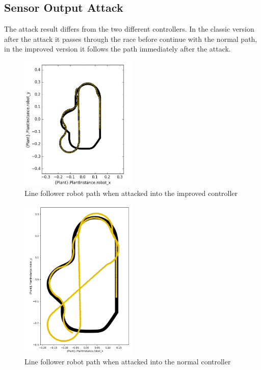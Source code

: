 \subsection{Sensor Output Attack}

The attack result differs from the two different controllers. In the classic
version after the attack it passes through the race before continue with the
normal path, in the improved version it follows the path immediately after the
attack.

\begin{figure}[htb]
	\centering
	\includegraphics[width=0.5\textwidth]{img/mm_sensor_output_attack_improved.png}
	\caption{Line follower robot path when
	attacked into the improved controller}\label{fig:senoutimpatkresult}
\end{figure}

\begin{figure}[htb]
	\centering
	\includegraphics[width=0.5\textwidth]{img/sensors-output-attack.png}
	\caption{Line follower robot path when
	attacked into the normal controller}\label{fig:senoutatkresult}
\end{figure}
